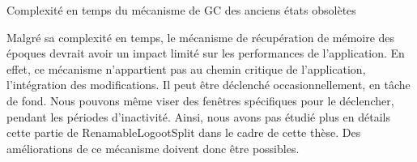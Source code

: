 \begin{table}[!ht]
  \centering
  \caption{Complexité en temps du mécanisme de \ac{GC} des anciens états obsolètes}
  \label{tab:time-complexity-gc-mechanism-epochs}
  \caption*{$p$: nombre de noeuds (ou pairs) du système, $e$: nombre d'époques dans l'\emph{arbre des époques}, $h$: hauteur de l'\emph{arbre des époques}}
\end{table}

Malgré sa complexité en temps, le mécanisme de récupération de mémoire des époques devrait avoir un impact limité sur les performances de l'application.
En effet, ce mécanisme n'appartient pas au chemin critique de l'application, \ie l'intégration des modifications.
Il peut être déclenché occasionnellement, en tâche de fond.
Nous pouvons même viser des fenêtres spécifiques pour le déclencher, \eg pendant les périodes d'inactivité.
Ainsi, nous avons pas étudié plus en détails cette partie de RenamableLogootSplit dans le cadre de cette thèse.
Des améliorations de ce mécanisme doivent donc être possibles.
